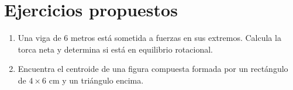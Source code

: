 \section{Ejercicios propuestos}

\begin{enumerate}
    \item Una viga de 6 metros está sometida a fuerzas en sus extremos. Calcula la torca neta y determina si está en equilibrio rotacional.
    \item Encuentra el centroide de una figura compuesta formada por un rectángulo de $4 \times 6$ cm y un triángulo encima.
\end{enumerate}
